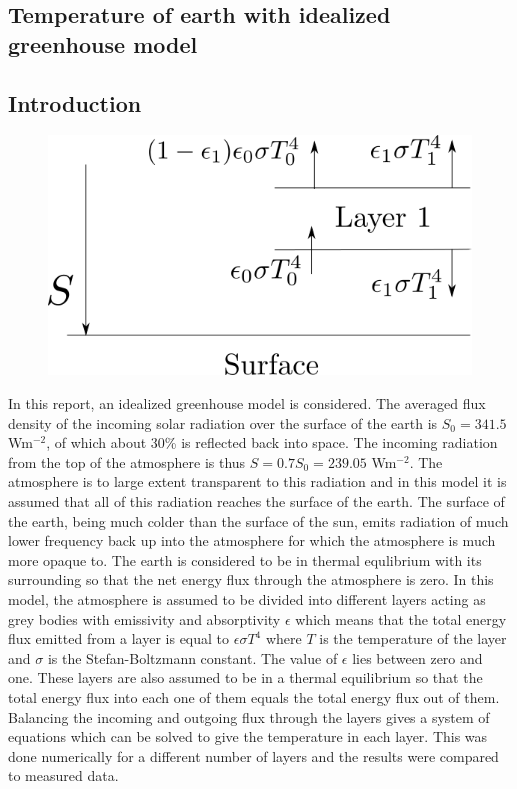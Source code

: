 \documentclass[twocolumn]{article}
\begin{document}
\begin{large}

\section*{Temperature of earth with idealized greenhouse model}
\subsection*{Introduction}
\begin{figure}[b!]
    \includegraphics[scale=0.5]{Layer1.png}
    \caption{}
    \label{11maj1748}
\end{figure}
In this report, an idealized greenhouse model is considered. The averaged flux density of the incoming solar radiation over the surface of the earth is $S_0 = 341.5$ Wm$^{-2}$, of which about $30$\% is reflected back into space. The incoming radiation from the top of the atmosphere is thus $S = 0.7S_0 = 239.05$ Wm$^{-2}$. The atmosphere is to large extent transparent to this radiation and in this model it is assumed that all of this radiation reaches the surface of the earth. The surface of the earth, being much colder than the surface of the sun, emits radiation of much lower frequency back up into the atmosphere for which the atmosphere is much more opaque to.  The earth is considered to be in thermal equlibrium with its surrounding so that the net energy flux through the atmosphere is zero. In this model, the atmosphere is assumed to be divided into different layers acting as grey bodies with emissivity and absorptivity $\epsilon$ which means that the total energy flux emitted from a layer is equal to $\epsilon\sigma T^4$ where $T$ is the temperature of the layer and $\sigma$ is the Stefan-Boltzmann constant. The value of $\epsilon$ lies between zero and one. These layers are also assumed to be in a thermal equilibrium so that the total energy flux into each one of them equals the total energy flux out of them. Balancing the incoming and outgoing flux through the layers gives a system of equations which can be solved to give the temperature in each layer. This was done numerically for a different number of layers and the results were compared to measured data. 


\end{large}
\end{document}
